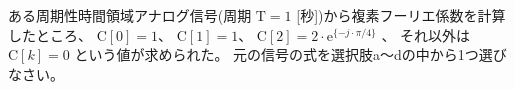 ある周期性時間領域アナログ信号(周期 $\textrm{T} = 1$ [秒])から複素フーリエ係数を計算したところ、
$\textrm{C}[0] = 1$、
$\textrm{C}[1] = 1$、
$\textrm{C}[2] = 2 \cdot \textrm{e}^{\{-j \cdot \pi/4 \}}$ 、
それ以外は $\textrm{C}[k] = 0$ という値が求められた。
元の信号の式を選択肢a〜dの中から1つ選びなさい。
